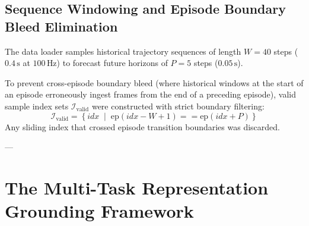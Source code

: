 \documentclass[11pt,a4paper]{article}
\begin{document}
\subsection{Sequence Windowing and Episode Boundary Bleed Elimination}
The data loader samples historical trajectory sequences of length $W = 40$ steps ($0.4\,\text{s}$ at $100\,\text{Hz}$) to forecast future horizons of $P = 5$ steps ($0.05\,\text{s}$). 

To prevent cross-episode boundary bleed (where historical windows at the start of an episode erroneously ingest frames from the end of a preceding episode), valid sample index sets $\mathcal{I}_{\text{valid}}$ were constructed with strict boundary filtering:
\begin{equation}
    \mathcal{I}_{\text{valid}} = \left\{ idx \;\middle|\; \text{ep}(idx - W + 1) == \text{ep}(idx + P) \right\}
\end{equation}
Any sliding index that crossed episode transition boundaries was discarded.

---

\section{The Multi-Task Representation Grounding Framework}
\label{sec:methodology}
\end{document}
